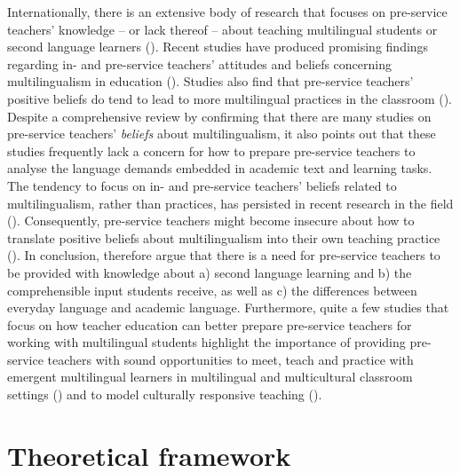 \documentclass[output=paper]{langscibook}
\begin{document}
Internationally, there is an extensive body of research that focuses on pre-service teachers’ knowledge – or lack thereof – about teaching multilingual students or second language learners (\citealt{AcquahEtAl2020,AcquahSzelei2020,AndersonStillman2013,BravoEtAl2014,GroulxSilva2010,TandonEtAl2017,VillegasEtAl2018}). Recent studies have produced promising findings regarding in- and pre-service teachers’ attitudes and beliefs concerning multilingualism in education (\citealt{Duarte2022,PaulsrudEtAl2023,SchroedlerEtAl2023,Thoma2022}). Studies also find that pre-service teachers’ positive beliefs do tend to lead to more multilingual practices in the classroom (\citealt{KirschEtAl2020,PalviainenEtAl2016,SchroedlerFischer2020}). Despite a comprehensive review by \citet{VillegasEtAl2018} confirming that there are many studies on pre-service teachers’ \textit{beliefs} about multilingualism, it also points out that these studies frequently lack a concern for how to prepare pre-service teachers to analyse the language demands embedded in academic text and learning tasks. The tendency to focus on in- and pre-service teachers' beliefs related to multilingualism, rather than practices, has persisted in recent research in the field (\citealt{Aleksic2023,Doll2023,Duarte2022,PaulsrudEtAl2023,Thoma2022}). Consequently, pre-service teachers might become insecure about how to translate positive beliefs about multilingualism into their own teaching practice (\citealt{SchroedlerEtAl2023}). In conclusion, \citet{VillegasEtAl2018} therefore argue that there is a need for pre-service teachers to be provided with knowledge about a) second language learning and b) the comprehensible input students receive, as well as c) the differences between everyday language and academic language. Furthermore, quite a few studies that focus on how teacher education can better prepare pre-service teachers for working with multilingual students highlight the importance of providing pre-service teachers with sound opportunities to meet, teach and practice with emergent multilingual learners in multilingual and multicultural classroom settings (\citealt{BravoEtAl2014,GroulxSilva2010}) and to model culturally responsive teaching (\citealt{AcquahEtAl2020}).

\section{Theoretical framework}
\end{document}
